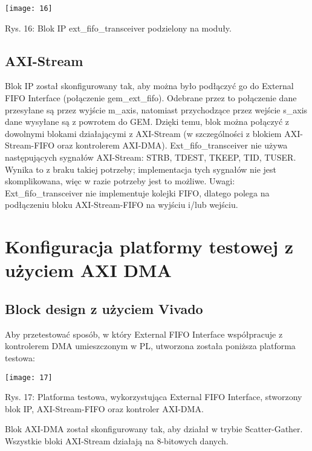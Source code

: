 \documentclass[11pt, letterpaper]{article}
\begin{document}
\texttt{[image: 16]}
\begin{center}
\caption{Rys. 16: Blok IP ext\_fifo\_transceiver podzielony na moduły.}
\end{center}
\vspace{5mm}

\subsection{AXI-Stream}
Blok IP został skonfigurowany tak, aby można było podłączyć go do External FIFO Interface (połączenie gem\_ext\_fifo). Odebrane przez to połączenie dane przesyłane są przez wyjście m\_axis, natomiast przychodzące przez wejście s\_axis dane wysyłane są z powrotem do GEM.
Dzięki temu, blok można połączyć z dowolnymi blokami działającymi z AXI-Stream (w szczególności z blokiem AXI-Stream-FIFO oraz kontrolerem AXI-DMA).
Ext\_fifo\_transceiver nie używa następujących sygnałów AXI-Stream: STRB, TDEST, TKEEP, TID, TUSER. Wynika to z braku takiej potrzeby; implementacja tych sygnałów nie jest skomplikowana, więc w razie potrzeby jest to możliwe.
Uwagi:
Ext\_fifo\_transceiver nie implementuje kolejki FIFO, dlatego polega na podłączeniu bloku AXI-Stream-FIFO na wyjściu i/lub wejściu.

\section{Konfiguracja platformy testowej z użyciem AXI DMA}
\subsection{Block design z użyciem Vivado}
Aby przetestować sposób, w który External FIFO Interface współpracuje z kontrolerem DMA umieszczonym w PL, utworzona została poniższa platforma testowa:

\texttt{[image: 17]}
\begin{center}
\caption{Rys. 17: Platforma testowa, wykorzystująca  External FIFO Interface, stworzony blok IP, AXI-Stream-FIFO oraz kontroler AXI-DMA.}
\end{center}
\vspace{5mm}

Blok AXI-DMA został skonfigurowany tak, aby działał w trybie Scatter-Gather. Wszystkie bloki AXI-Stream działają na 8-bitowych danych.
\end{document}
